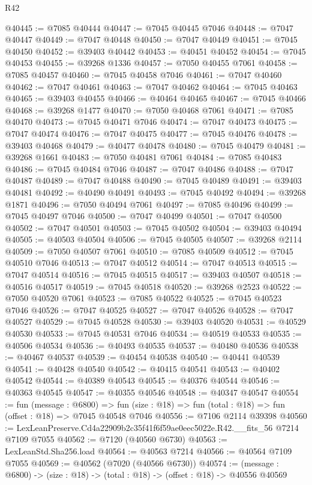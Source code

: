 \begin{lexlean}{R42}
\begin{coremodule}
{@40445 := @7085 @40444
@40447 := @7045 @40445 @7046
@40448 := @7047 @40447
@40449 := @7047 @40448
@40450 := @7047 @40449
@40451 := @7045 @40450
@40452 := @39403 @40442
@40453 := @40451 @40452
@40454 := @7045 @40453
@40455 := @39268 @1336
@40457 := @7050 @40455 @7061
@40458 := @7085 @40457
@40460 := @7045 @40458 @7046
@40461 := @7047 @40460
@40462 := @7047 @40461
@40463 := @7047 @40462
@40464 := @7045 @40463
@40465 := @39403 @40455
@40466 := @40464 @40465
@40467 := @7045 @40466
@40468 := @39268 @1477
@40470 := @7050 @40468 @7061
@40471 := @7085 @40470
@40473 := @7045 @40471 @7046
@40474 := @7047 @40473
@40475 := @7047 @40474
@40476 := @7047 @40475
@40477 := @7045 @40476
@40478 := @39403 @40468
@40479 := @40477 @40478
@40480 := @7045 @40479
@40481 := @39268 @1661
@40483 := @7050 @40481 @7061
@40484 := @7085 @40483
@40486 := @7045 @40484 @7046
@40487 := @7047 @40486
@40488 := @7047 @40487
@40489 := @7047 @40488
@40490 := @7045 @40489
@40491 := @39403 @40481
@40492 := @40490 @40491
@40493 := @7045 @40492
@40494 := @39268 @1871
@40496 := @7050 @40494 @7061
@40497 := @7085 @40496
@40499 := @7045 @40497 @7046
@40500 := @7047 @40499
@40501 := @7047 @40500
@40502 := @7047 @40501
@40503 := @7045 @40502
@40504 := @39403 @40494
@40505 := @40503 @40504
@40506 := @7045 @40505
@40507 := @39268 @2114
@40509 := @7050 @40507 @7061
@40510 := @7085 @40509
@40512 := @7045 @40510 @7046
@40513 := @7047 @40512
@40514 := @7047 @40513
@40515 := @7047 @40514
@40516 := @7045 @40515
@40517 := @39403 @40507
@40518 := @40516 @40517
@40519 := @7045 @40518
@40520 := @39268 @2523
@40522 := @7050 @40520 @7061
@40523 := @7085 @40522
@40525 := @7045 @40523 @7046
@40526 := @7047 @40525
@40527 := @7047 @40526
@40528 := @7047 @40527
@40529 := @7045 @40528
@40530 := @39403 @40520
@40531 := @40529 @40530
@40533 := @7045 @40531 @7046
@40534 := @40519 @40533
@40535 := @40506 @40534
@40536 := @40493 @40535
@40537 := @40480 @40536
@40538 := @40467 @40537
@40539 := @40454 @40538
@40540 := @40441 @40539
@40541 := @40428 @40540
@40542 := @40415 @40541
@40543 := @40402 @40542
@40544 := @40389 @40543
@40545 := @40376 @40544
@40546 := @40363 @40545
@40547 := @40355 @40546
@40548 := @40347 @40547
@40554 := fun (message : @6800) =>
  fun (size : @18) => fun (total : @18) => fun (offset : @18) => @7045 @40548 @7046
@40556 := @7106 @2114 @39398
@40560 := LexLeanPreserve.Cd4a22909b2c35f41f6f59ae0eec5022e.R42.__fits_56 @7214 @7109 @7055
@40562 := @7120 (@40560 @6730)
@40563 := LexLeanStd.Sha256.load
@40564 := @40563 @7214
@40566 := @40564 @7109 @7055
@40569 := @40562 (@7020 (@40566 @6730))
@40574 := (message : @6800) -> (size : @18) -> (total : @18) -> (offset : @18) -> @40556 @40569
}
\end{coremodule}
\end{lexlean}
